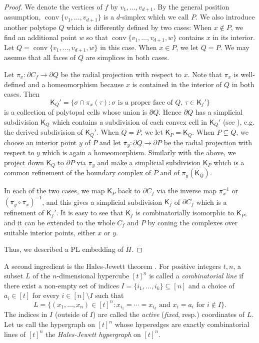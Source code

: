 \documentclass{article}
\theoremstyle{definition}
\DeclareMathOperator{\conv}{conv}
\begin{document}
\begin{proof}
We denote the vertices of $f$ by $v_1, \dots, v_{d+1}$. By the general position assumption, $\conv\{v_1, \dots, v_{d+1}\}$ is a $d$-simplex which we call $P$. We also introduce another polytope $Q$ which is differently defined by two cases: When $x \notin P$, we find an additional point $w$ so that $\conv\{v_1, \dots, v_{d+1}, w\}$ contains $x$ in its interior. Let $Q=\conv\{v_1, \dots, v_{d+1}, w\}$ in this case. When $x \in P$, we let $Q=P$. We may assume that all faces of $Q$ are simplices  in both cases.

Let $\pi_x: \partial C_f \to \partial Q$ be the radial projection with respect to $x$. Note that $\pi_x$ is well-defined and a homeomorphism because $x$ is contained in the interior of $Q$ in both cases. Then
\[\mathsf{K}_Q'=\{\sigma\cap \pi_x(\tau): \textrm{$\sigma$ is a proper face of $Q$, } \tau\in \mathsf{K}_f'\} \]
is a collection of polytopal cells whose union is  $\partial Q$. Hence $\partial Q$ has a simplicial subdivision $\mathsf{K}_Q$ which contains a subdivision of each convex cell in $\mathsf{K}_Q'$ (see \cite[Lemma 1.5]{piecewise_linear_hudson}), e.g. the derived subdivision of $\mathsf{K}_Q'$. When $Q=P$, we let $\mathsf{K}_P=\mathsf{K}_Q$. When $P \subsetneq Q$, we choose an interior point $y$ of $P$ and let $\pi_y: \partial Q \to \partial P$ be the radial projection with respect to $y$ which is again a homeomorphism. Similarly with the above, we project down $\mathsf{K}_Q$ to $\partial P$ via $\pi_y$ and make a simplicial subdivision $\mathsf{K}_P$ which is a common refinement of the boundary complex of $P$ and of $\pi_y(\mathsf{K}_Q)$.
 
 In each of the two cases, we map $\mathsf{K}_P$ back to $\partial C_f$ via the inverse map $\pi_x^{-1}$ or $(\pi_y\circ\pi_x)^{-1}$, and this gives a simplicial subdivision $\mathsf{K}_f$ of $\partial C_f$ which is a refinement of $\mathsf{K}_f'$. It is easy to see that $\mathsf{K}_f$ is combinatorially isomorphic to $\mathsf{K}_P$, and it can be extended to the whole $C_f$ and $P$ by coning the complexes over suitable interior points, either $x$ or $y$. 
 
 Thus, we described a PL embedding of $H$.
\end{proof}

A second ingredient is the Hales-Jewett theorem \cite{hales-jewett}. For positive integers $t, n$, a subset $L$ of the $n$-dimensional hypercube $[t]^n$ is called a \textit{combinatorial line} if there exist a non-empty set of indices $I = \{i_1, . . . , i_k\} \subseteq [n]$ and a choice of $a_i \in [t]$
for every $i \in [n] \setminus I$ such that
$$L = \{(x_1, \dots, x_n) \in [t]^n : x_{i_1} = \cdots = x_{i_k} \textrm{ and } x_i = a_i \textrm{ for } i \notin I\}.$$
The indices in $I$ (outside of $I$) are called the \textit{active} (\textit{fixed}, resp.) coordinates of $L$.
Let us call the hypergraph on $[t]^n$ whose hyperedges are exactly combinatorial lines of $[t]^n$ the \textit{Hales-Jewett hypergraph} on $[t]^n$. 
\end{document}
